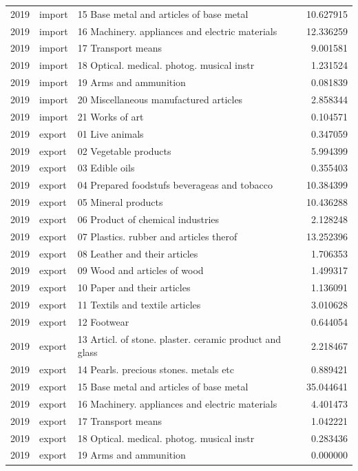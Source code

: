 \begin{tabular}{rllr}
2019 & import & 15 Base metal and articles of base metal & 10.627915 \\
2019 & import & 16 Machinery. appliances and electric materials & 12.336259 \\
2019 & import & 17 Transport means & 9.001581 \\
2019 & import & 18 Optical. medical. photog. musical instr & 1.231524 \\
2019 & import & 19 Arms and ammunition & 0.081839 \\
2019 & import & 20 Miscellaneous manufactured articles & 2.858344 \\
2019 & import & 21 Works of art & 0.104571 \\
2019 & export & 01 Live animals & 0.347059 \\
2019 & export & 02 Vegetable products & 5.994399 \\
2019 & export & 03 Edible oils & 0.355403 \\
2019 & export & 04 Prepared foodstufs beverageas and tobacco & 10.384399 \\
2019 & export & 05 Mineral products & 10.436288 \\
2019 & export & 06 Product of chemical industries & 2.128248 \\
2019 & export & 07 Plastics. rubber and articles therof & 13.252396 \\
2019 & export & 08 Leather and their articles & 1.706353 \\
2019 & export & 09 Wood and articles of wood & 1.499317 \\
2019 & export & 10 Paper and their articles & 1.136091 \\
2019 & export & 11 Textils and textile articles & 3.010628 \\
2019 & export & 12 Footwear & 0.644054 \\
2019 & export & 13 Articl. of stone. plaster. ceramic product and glass & 2.218467 \\
2019 & export & 14 Pearls. precious stones. metals etc & 0.889421 \\
2019 & export & 15 Base metal and articles of base metal & 35.044641 \\
2019 & export & 16 Machinery. appliances and electric materials & 4.401473 \\
2019 & export & 17 Transport means & 1.042221 \\
2019 & export & 18 Optical. medical. photog. musical instr & 0.283436 \\
2019 & export & 19 Arms and ammunition & 0.000000 \\

\end{tabular}
